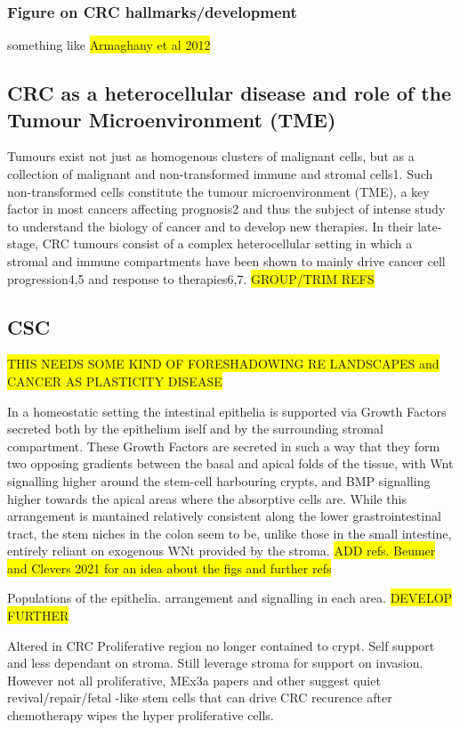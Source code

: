 \subsubsection{Figure on CRC hallmarks/development}
something like \colorbox{yellow}{Armaghany et al 2012}

\subsection{CRC as a heterocellular disease and role of the Tumour Microenvironment (TME)}

Tumours exist not just as homogenous clusters of malignant cells, but as a collection of malignant and non-transformed immune and stromal cells1. Such non-transformed cells constitute the tumour microenvironment (TME), a key factor in most cancers affecting prognosis2 and thus the subject of intense study to understand the biology of cancer and to develop new therapies.
In their late-stage, CRC tumours consist of a complex heterocellular setting in which a stromal and immune compartments have been shown to mainly drive cancer cell progression4,5 and response to therapies6,7.   \colorbox{yellow}{GROUP/TRIM REFS}

\subsection{CSC}

\colorbox{yellow}{THIS NEEDS SOME KIND OF FORESHADOWING RE LANDSCAPES and CANCER AS PLASTICITY DISEASE}

In a homeostatic setting the intestinal epithelia is supported via Growth Factors secreted both by the epithelium iself and by the surrounding stromal compartment. These Growth Factors are secreted in such a way that they form two opposing gradients between the basal and apical folds of the tissue, with Wnt signalling higher around the stem-cell harbouring crypts, and BMP signalling higher towards the apical areas where the absorptive cells are. 
While this arrangement is mantained relatively consistent along the lower grastrointestinal tract, the stem niches in the colon seem to be, unlike those in the small intestine, entirely reliant on exogenous WNt provided by the stroma.
\colorbox{yellow}{ADD refs. Beumer and Clevers 2021 for an idea about the figs and further refs}

Populations of the epithelia. arrangement and signalling in each area. \colorbox{yellow}{DEVELOP FURTHER}

Altered in CRC
Proliferative region no longer contained to crypt. Self support and less dependant on stroma. Still leverage stroma for support on invasion. 
However not all proliferative, MEx3a papers and other suggest quiet revival/repair/fetal -like stem cells that can drive CRC recurence after chemotherapy wipes the hyper proliferative cells.

